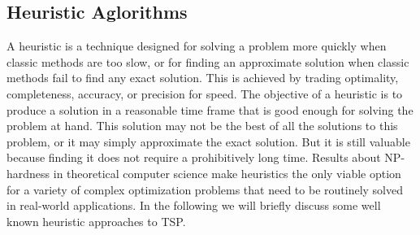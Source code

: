 \documentclass[11pt]{article}
\begin{document}
\subsection{Heuristic Aglorithms}
A heuristic is a technique designed for solving a problem more quickly when classic methods are too slow, or for finding an approximate solution when classic methods fail to find any exact solution. This is achieved by trading optimality, completeness, accuracy, or precision for speed. The objective of a heuristic is to produce a solution in a reasonable time frame that is good enough for solving the problem at hand. This solution may not be the best of all the solutions to this problem, or it may simply approximate the exact solution. But it is still valuable because finding it does not require a prohibitively long time. Results about NP-hardness in theoretical computer science make heuristics the only viable option for a variety of complex optimization problems that need to be routinely solved in real-world applications. In the following we will briefly discuss some well known heuristic approaches to TSP.
\end{document}
